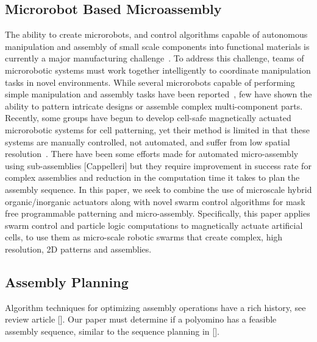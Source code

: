 \subsection{Microrobot Based Microassembly}
The ability to create microrobots, and control algorithms capable of autonomous manipulation and assembly of small scale components into functional materials is currently a major manufacturing challenge~\cite{chang2005therapeutic}. 
To address this challenge, teams of microrobotic systems must work together intelligently to coordinate manipulation tasks in novel environments. 
While several microrobots capable of performing simple manipulation and assembly tasks have been reported~\cite{prakash2007artificial,chang2007artificial,weibel2007microfabrication,abbott2007robotics,yi2006microfluidics,castillo2009manipulation}, few have shown the ability to pattern intricate designs or assemble complex multi-component parts. 
Recently, some groups have begun to develop cell-safe magnetically actuated microrobotic systems for cell patterning, yet their method is limited in that these systems are manually controlled, not automated, and suffer from low spatial resolution~\cite{tasoglu2014untethered,tasoglu2014guided}. 
There have been some efforts made for automated micro-assembly using sub-assemblies [Cappelleri] but they require improvement in success rate for complex assemblies and reduction in the computation time it takes to plan the assembly sequence.
In this paper, we seek to combine the use of microscale hybrid organic/inorganic actuators along with novel swarm control algorithms for mask free programmable patterning and micro-assembly. 
Specifically, this paper applies swarm control and particle logic computations to magnetically actuate artificial cells, to use them as micro-scale robotic swarms that create complex, high resolution, 2D patterns and assemblies.


\subsection{Assembly Planning}
Algorithm techniques for optimizing assembly operations have a rich history, see review article [].
Our paper must determine if a polyomino has a feasible assembly sequence, similar to the sequence planning in [].





 

